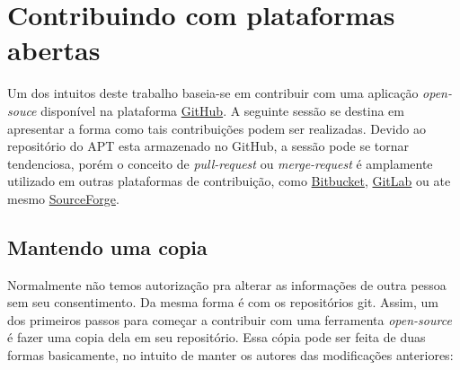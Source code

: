 \section{Contribuindo com plataformas abertas} %
\label{sec:contribuindo_com_plataformas_abertas}

Um dos intuitos deste trabalho baseia-se em contribuir com uma aplicação \textit{open-souce} disponível na plataforma \href{GitHub.com}{GitHub}. A seguinte sessão se destina em apresentar a forma como tais contribuições podem ser realizadas. Devido ao repositório do APT esta armazenado no GitHub, a sessão pode se tornar tendenciosa, porém o conceito de \textit{pull-request} ou  \textit{merge-request} é amplamente utilizado em outras plataformas de contribuição, como \href{https://bitbucket.org/}{Bitbucket}, \href{https://gitlab.com/}{GitLab} ou ate mesmo \href{http://sourceforge.net/}{SourceForge}.


\subsection*{Mantendo uma copia} %
\label{sub:mantendo_uma_copia_sua}


Normalmente não temos autorização pra alterar as informações de outra pessoa sem seu consentimento. Da mesma forma  é com os repositórios {\code git}. Assim, um dos primeiros passos para começar a contribuir com uma ferramenta \textit{open-source} é fazer uma copia dela em seu repositório. Essa cópia pode ser feita de duas formas basicamente, no intuito de manter os autores das modificações anteriores:

